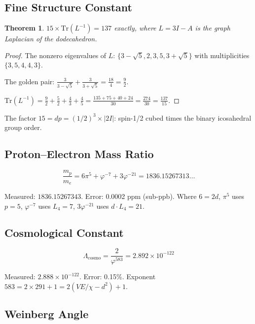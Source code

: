 \documentclass[12pt,a4paper]{article}
\newtheorem{theorem}{Theorem}
\begin{document}
\subsection{Fine Structure Constant}

\begin{theorem}
$15 \times \mathrm{Tr}(L^{-1}) = 137$ exactly, where $L = 3I - A$ is the graph Laplacian of the dodecahedron.
\end{theorem}

\begin{proof}
The nonzero eigenvalues of $L$: $\{3-\sqrt{5}, 2, 3, 5, 3+\sqrt{5}\}$ with multiplicities $\{3,5,4,4,3\}$.

The golden pair: $\frac{3}{3-\sqrt{5}} + \frac{3}{3+\sqrt{5}} = \frac{18}{4} = \frac{9}{2}$.

$\mathrm{Tr}(L^{-1}) = \frac{9}{2} + \frac{5}{2} + \frac{4}{3} + \frac{4}{5} = \frac{135+75+40+24}{30} = \frac{274}{30} = \frac{137}{15}$.
\end{proof}

The factor $15 = dp = (1/2)^3 \times |2I|$: spin-1/2 cubed times the binary icosahedral group order.

\subsection{Proton--Electron Mass Ratio}

\begin{equation}
\frac{m_p}{m_e} = 6\pi^5 + \varphi^{-7} + 3\varphi^{-21} = 1836.15267313\ldots
\end{equation}

Measured: $1836.15267343$. Error: 0.0002 ppm (sub-ppb). Where $6 = 2d$, $\pi^5$ uses $p=5$, $\varphi^{-7}$ uses $L_4 = 7$, $3\varphi^{-21}$ uses $d \cdot L_4 = 21$.

\subsection{Cosmological Constant}

\begin{equation}
\Lambda_{\mathrm{cosmo}} = \frac{2}{\varphi^{583}} = 2.892 \times 10^{-122}
\end{equation}

Measured: $2.888 \times 10^{-122}$. Error: 0.15\%. Exponent $583 = 2 \times 291 + 1 = 2(VE/\chi - d^2) + 1$.

\subsection{Weinberg Angle}
\end{document}
